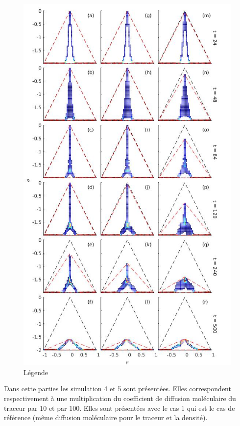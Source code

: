 \documentclass[a4paper,12pt]{article}
\begin{document}
    \begin{figure}[!h]
        \centering
        \label{scatterplot_phi}
        \includegraphics[width=0.8\linewidth]{figures/scatterplot_phidiff.jpg}
        \caption{Légende}
    \end{figure}
    Dans cette parties les simulation 4 et 5 sont présentées. Elles correspondent respectivement à une multiplication du coefficient de diffusion moléculaire du traceur par 10 et par 100. Elles sont présentées avec le cas 1 qui est le cas de référence (même diffusion moléculaire pour le traceur et la densité).
\end{document}
